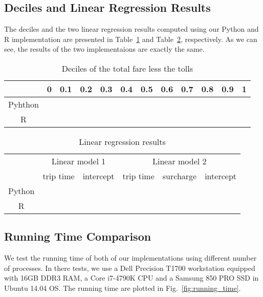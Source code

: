 \documentclass{article}
\begin{document}
\subsection{Deciles and Linear Regression Results}
The deciles and the two linear regression results computed using our Python and
R implementation are presented in Table~\ref{tab:decile} and Table~\ref{tab:lm},
respectively. As we can see, the results of the two implementaions are exactly
the same.

\begin{table}[!t]
    \renewcommand{\arraystretch}{1.3}
    \caption{Deciles of the total fare less the tolls}
    \label{tab:decile}
    \centering
    \begin{tabular}{c|ccccccccccc}
        \hline
         & 0 & 0.1 & 0.2 & 0.3 & 0.4 & 0.5 & 0.6 & 0.7 & 0.8 & 0.9 & 1 \\
        \hline
        Pyhthon & & & & & & & & & & & \\
        R & & & & & & & & & & & \\
        \hline
    \end{tabular}
\end{table}

\begin{table}[!t]
    \renewcommand{\arraystretch}{1.3}
    \caption{Linear regression results}
    \label{tab:lm}
    \centering
    \begin{tabular}{c|cc|ccc}
        \hline
        \multirow{2}{*}{} & \multicolumn{2}{c|}{Linear model 1} &
        \multicolumn{3}{c}{Linear model 2} \\
        \hhline{~-----} & trip time & intercept & trip time & surcharge &
        intercept \\
        \hline
        Python & & & & & \\
        R & & & & & \\
        \hline
    \end{tabular}
\end{table}

\subsection{Running Time Comparison}
We test the running time of both of our implementations using different number
of processes. In there tests, we use a Dell Precision T1700 workstation equipped
with 16GB DDR3 RAM, a Core i7-4790K CPU and a Samsung 850 PRO SSD in Ubuntu
14.04 OS. The running time are plotted in Fig.~\ref{fig:running_time}.
\end{document}
